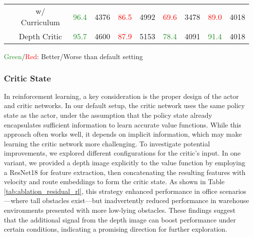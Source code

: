 \documentclass[letterpaper, 10 pt,conference]{ieeeconf}
\begin{document}
\begin{table*}[ht]
\begin{tabular}{c|c|cc|cc|cc|cc}
        & w/ Curriculum & \textcolor{ForestGreen}{96.4} & 4376 & \textcolor{red}{86.5} & 4992 & \textcolor{red}{69.6} & 3478 & \textcolor{red}{89.0} & 4018 \\
        & Depth Critic & \textcolor{ForestGreen}{95.7} & 4600 & \textcolor{red}{87.9} & 5153 & \textcolor{ForestGreen}{78.4} & 4091 & \textcolor{ForestGreen}{91.4} & 4018 \\
        \bottomrule
    \end{tabular}
    \begin{tablenotes}
    \item \textcolor{ForestGreen}{Green}/\textcolor{red}{Red}: Better/Worse than default setting
    \end{tablenotes}
    \label{tab:ablation_residual_rl}
\end{table*}


\subsubsection{Critic State}

In reinforcement learning, a key consideration is the proper design of the actor and critic networks. In our default setup, the critic network uses the same policy state as the actor, under the assumption that the policy state already encapsulates sufficient information to learn accurate value functions. While this approach often works well, it depends on implicit information, which may make learning the critic network more challenging. To investigate potential improvements, we explored different configurations for the critic's input. In one variant, we provided a depth image explicitly to the value function by employing a ResNet18 for feature extraction, then concatenating the resulting features with velocity and route embeddings to form the critic state. As shown in Table \ref{tab:ablation_residual_rl}, this strategy enhanced performance in office scenarios—where tall obstacles exist—but inadvertently reduced performance in warehouse environments presented with more low-lying obstacles. These findings suggest that the additional signal from the depth image can boost performance under certain conditions, indicating a promising direction for further exploration.
\end{document}
